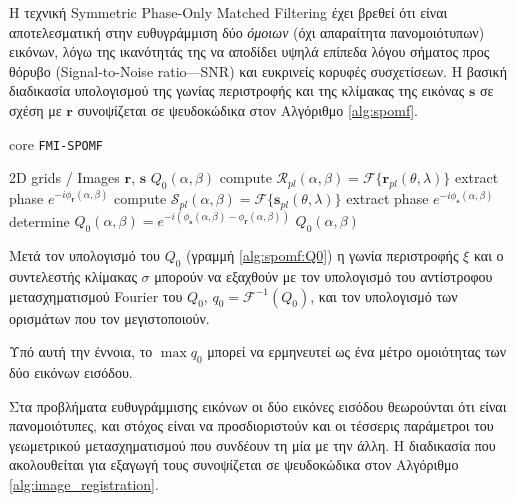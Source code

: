 Η τεχνική Symmetric Phase-Only Matched Filtering \cite{Qin-ShengChen1994a} έχει
βρεθεί ότι είναι αποτελεσματική στην ευθυγράμμιση δύο \textit{όμοιων} (όχι
απαραίτητα πανομοιότυπων) εικόνων, λόγω της ικανότητάς της να αποδίδει υψηλά
επίπεδα λόγου σήματος προς θόρυβο (Signal-to-Noise ratio---SNR) και ευκρινείς
κορυφές συσχετίσεων. Η βασική διαδικασία υπολογισμού της γωνίας περιστροφής και
της κλίμακας της εικόνας $\bm{s}$ σε σχέση με $\bm{r}$ συνοψίζεται σε
ψευδοκώδικα στον Αλγόριθμο \ref{alg:spomf}.

\begin{algorithm}
  \caption{core \texttt{FMI-SPOMF}}
  \label{alg:spomf}
  \begin{spacing}{1.2}
  \begin{algorithmic}[1]
    \REQUIRE 2D grids / Images $\bm{r}$, $\bm{s}$
    \ENSURE $Q_0(\alpha,\beta)$
    \STATE compute $\mathcal{R}_{pl}(\alpha,\beta) = \mathcal{F}\{\bm{r}_{pl}(\theta,\lambda)\}$
    \STATE extract phase $e^{-i\phi_{\bm{r}}(\alpha, \beta)}$
    \STATE compute $\mathcal{S}_{pl}(\alpha,\beta) = \mathcal{F}\{\bm{s}_{pl}(\theta,\lambda)\}$
    \STATE extract phase $e^{-i\phi_{\bm{s}}(\alpha, \beta)}$
    \STATE determine $Q_0(\alpha, \beta) = e^{-i(\phi_{\bm{s}}(\alpha, \beta)-\phi_{\bm{r}}(\alpha, \beta))}$ \label{alg:spomf:Q0}
    \RETURN $Q_0(\alpha,\beta)$
  \end{algorithmic}
  \end{spacing}
\end{algorithm}
Μετά τον υπολογισμό του $Q_0$ (γραμμή \ref{alg:spomf:Q0}) η γωνία περιστροφής
$\xi$ και ο συντελεστής κλίμακας $\sigma$ μπορούν να εξαχθούν με τον υπολογισμό
του αντίστροφου μετασχηματισμού Fourier του $Q_0$, $q_0 =
\mathcal{F}^{-1}(Q_0)$, και τον υπολογισμό των ορισμάτων που τον μεγιστοποιούν.

\begin{gg_box}
  \begin{remark}
    \label{remark:01_01_02:q0_similarity_measure}
    Υπό αυτή την έννοια, το $\max q_0$ μπορεί να ερμηνευτεί ως ένα μέτρο
    ομοιότητας των δύο εικόνων εισόδου.
  \end{remark}
\end{gg_box}

Στα προβλήματα ευθυγράμμισης εικόνων οι δύο εικόνες εισόδου θεωρούνται ότι
είναι πανομοιότυπες, και στόχος είναι να προσδιοριστούν και οι τέσσερις
παράμετροι του γεωμετρικού μετασχηματισμού που συνδέουν τη μία με την άλλη. Η
διαδικασία που ακολουθείται για εξαγωγή τους συνοψίζεται σε ψευδοκώδικα
στον Αλγόριθμο \ref{alg:image_registration}.


